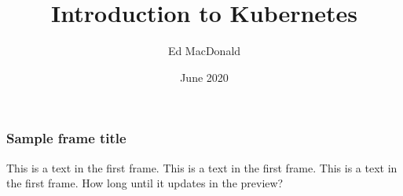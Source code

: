 \documentclass{beamer}
\title{Introduction to Kubernetes}
\author{Ed MacDonald}
\institute{Solution Street}
\date{June 2020}
\begin{document}
\frame{\titlepage}

\begin{frame}
\frametitle{Sample frame title}
This is a text in the first frame. This is a text in the first frame. This is a text in the first frame. How long until it updates in the preview?
\end{frame}
\end{document}

